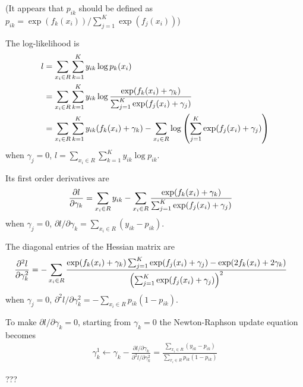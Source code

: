 \begin{exercise}
  (It appears that $p_{ik}$ should be defined as $p_{ik}
  =\exp(f_k(x_i))/\sum_{j=1}^K\exp(f_j(x_i))$)
  
  \begin{exerciseSection}
    The log-likelihood is
    \begin{align}
      l &= \sum_{x_i\in R}\sum_{k=1}^Ky_{ik}\log p_k(x_i) \notag\\
      &= \sum_{x_i\in R}\sum_{k=1}^Ky_{ik} \log\frac{\exp(f_k(x_i) +
      \gamma_k)}{\sum_{j=1}^K \exp(f_j(x_i) + \gamma_j)} \notag\\
      &= \sum_{x_i\in R}\sum_{k=1}^K y_{ik}(f_k(x_i) +
      \gamma_k) - \sum_{x_i\in R} \log\left(\sum_{j=1}^K \exp(f_j(x_i) +
      \gamma_j)\right)
    \end{align}
    when $\gamma_j=0$, $l=\sum_{x_i\in R}\sum_{k=1}^Ky_{ik}\log p_{ik}$.
    
    Its first order derivatives are
    \begin{align}
      \pdv{l}{\gamma_k} &= \sum_{x_i\in R}y_{ik} - \sum_{x_i\in R}
      \frac{\exp(f_k(x_i) + \gamma_k)}
      {\sum_{j=1}^K \exp(f_j(x_i) + \gamma_j)}
    \end{align}
    when $\gamma_j=0$, $\partial{l}/\partial{\gamma_k}=\sum_{x_i\in
    R}(y_{ik} - p_{ik})$.
    
    The diagonal entries of the Hessian matrix are
    \begin{align}
      \pdv[2]{l}{\gamma_k} &= -\sum_{x_i\in R} \frac{\exp(f_k(x_i) +
      \gamma_k)\sum_{j=1}^K \exp(f_j(x_i) + \gamma_j) - \exp(2f_k(x_i) +
      2\gamma_k)} {\left(\sum_{j=1}^K
      \exp(f_j(x_i) + \gamma_j) \right)^2}
    \end{align}
    when $\gamma_j=0$, $\partial^2{l}/\partial{\gamma_k^2}=-\sum_{x_i\in
    R}p_{ik}(1 - p_{ik})$.
  \end{exerciseSection}
  
  \begin{exerciseSection}
    To make $\partial{l}/\partial{\gamma_k}=0$, starting from $\gamma_k=0$ the
    Newton-Raphson update equation becomes
    \begin{align}
      \gamma_k^1 \leftarrow \gamma_k - \frac{\partial{l}/\partial{\gamma_k}}
      {\partial^2{l}/\partial{\gamma_k^2}} = \frac{\sum_{x_i\in
    R}(y_{ik} - p_{ik})} {\sum_{x_i\in R}p_{ik}(1 - p_{ik})}
    \end{align}
  \end{exerciseSection}
  
  \begin{exerciseSection}
    ???
  \end{exerciseSection}
\end{exercise}

